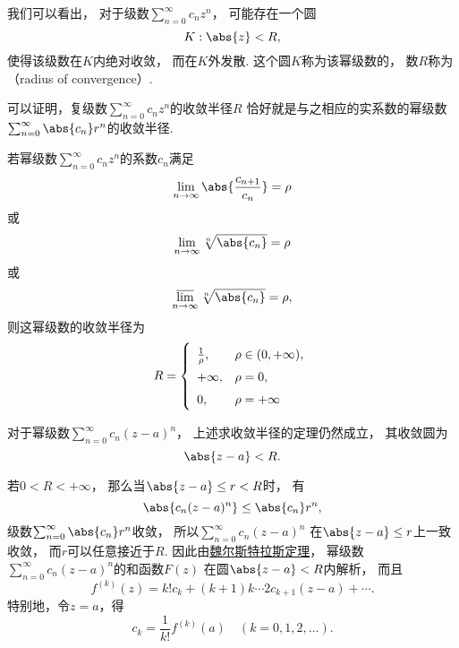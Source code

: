 我们可以看出，
对于级数\(\sum_{n=0}^\infty c_n z^n\)，
可能存在一个圆\[
	K: \abs{z} < R,
\]使得该级数在\(K\)内绝对收敛，
而在\(K\)外发散.
这个圆\(K\)称为该幂级数的，
数\(R\)称为（radius of convergence）.

可以证明，复级数\(\sum_{n=0}^\infty c_n z^n\)的收敛半径\(R\)
恰好就是与之相应的实系数的幂级数\(\sum_{n=0}^\infty \abs{c_n} r^n\)的收敛半径.

\begin{theorem}\label{theorem:解析函数的级数表示.复幂级数的收敛半径的求法}
若幂级数\(\sum_{n=0}^\infty c_n z^n\)的系数\(c_n\)满足\[
	\lim_{n\to\infty} \abs{\frac{c_{n+1}}{c_n}} = \rho
\]或\[
	\lim_{n\to\infty} \sqrt[n]{\abs{c_n}} = \rho
\]或\[
	\varlimsup_{n\to\infty} \sqrt[n]{\abs{c_n}} = \rho,
\]
则这幂级数的收敛半径为\[
	\def\arraystretch{1.5}
	R = \left\{ \begin{array}{ll}
		\frac{1}{\rho}, & \rho \in (0,+\infty), \\
		+\infty, & \rho = 0, \\
		0, & \rho = +\infty \\
	\end{array} \right.
\]
\end{theorem}
对于幂级数\(\sum_{n=0}^\infty c_n (z-a)^n\)，
上述求收敛半径的定理仍然成立，
其收敛圆为\[
	\abs{z-a}<R.
\]

若\(0<R<+\infty\)，
那么当\(\abs{z-a} \leq r < R\)时，
有\[
	\abs{c_n (z-a)^n} \leq \abs{c_n} r^n,
\]
级数\(\sum_{n=0}^\infty \abs{c_n} r^n\)收敛，
所以\(\sum_{n=0}^\infty c_n (z-a)^n\)
在\(\abs{z-a} \leq r\)上一致收敛，
而\(r\)可以任意接近于\(R\).
因此由\hyperref[theorem:解析函数的级数表示.魏尔斯特拉斯定理]{魏尔斯特拉斯定理}，
幂级数\(\sum_{n=0}^\infty c_n (z-a)^n\)的和函数\(F(z)\)
在圆\(\abs{z-a}<R\)内解析，
而且\[
	f^{(k)}(z) = k! c_k + (k+1)k\dotsm2c_{k+1}(z-a)+\dotsb.
\]
特别地，令\(z=a\)，得\[
	c_k = \frac{1}{k!} f^{(k)}(a)
	\quad(k=0,1,2,\dotsc).
\]

